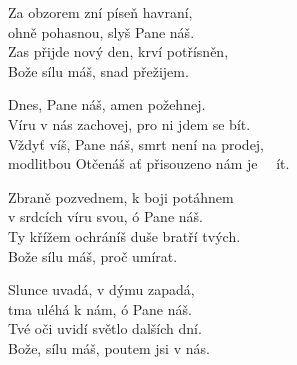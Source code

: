 
\ve{}
Za obzorem zní píseň havraní,\\
ohně pohasnou, slyš Pane náš.\\
Zas přijde nový den, krví potřísněn,\\
Bože sílu máš, snad přežijem. 

\cho{}
Dnes,  Pane náš, amen požehnej.\\
Víru v nás zachovej, pro ni jdem se bít.\\
Vždyť víš, Pane náš, smrt není na prodej,\\
modlitbou Otčenáš ať přisouzeno nám je \ \ ít.

\ve{}
Zbraně pozvednem, k boji potáhnem\\
v srdcích víru svou, ó Pane náš.\\
Ty křížem ochráníš duše bratří tvých.\\
Bože sílu máš, proč umírat. 

\cho{}

\ve{}
Slunce uvadá, v dýmu zapadá,\\
tma uléhá k nám, ó Pane náš.\\
Tvé oči uvidí světlo dalších dní.\\
Bože, sílu máš, poutem jsi v nás. 

\cho{}

\esong